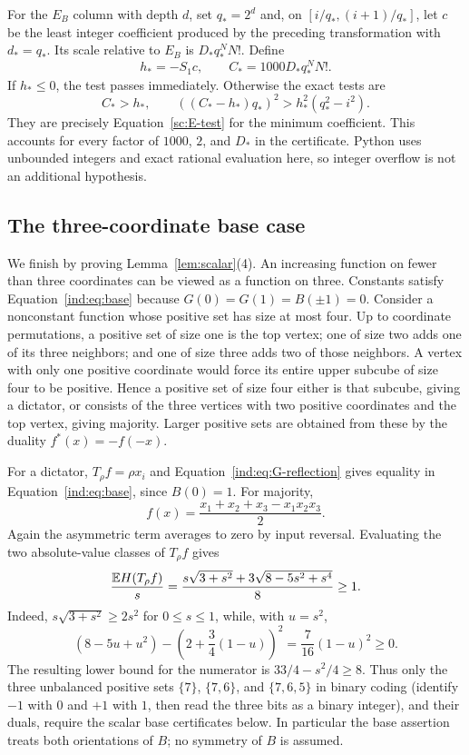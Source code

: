 For the $E_B$ column with depth $d$, set $q_*=2^d$ and, on
$[i/q_*,(i+1)/q_*]$, let $c$ be the least integer coefficient produced
by the preceding transformation with $d_*=q_*$.  Its scale relative to
$E_B$ is $D_*q_*^NN!$.  Define
\[
 h_*=-S_1c,\qquad C_*=1000D_*q_*^NN!.
\]
If $h_*\leq0$, the test passes immediately.  Otherwise the exact tests are
\begin{equation}\label{sc:E-integer}
 C_*>h_*,\qquad
 ((C_*-h_*)q_*)^2>h_*^2(q_*^2-i^2).
\end{equation}
They are precisely Equation~\eqref{sc:E-test} for the minimum coefficient.
This accounts for every factor of $1000$, $2$, and $D_*$ in the
certificate.  Python uses unbounded integers and exact rational
evaluation here, so integer overflow is not an additional hypothesis.

\subsection{The three-coordinate base case}\label{sc:base}

We finish by proving Lemma~\ref{lem:scalar}(4).  An increasing
function on fewer than three coordinates can be viewed as a function on
three.  Constants satisfy Equation~\eqref{ind:eq:base} because
$G(0)=G(1)=B(\pm1)=0$.  Consider a nonconstant function whose positive
set has size at most four.  Up to coordinate permutations, a positive
set of size one is the top vertex; one of size two adds one of its three
neighbors; and one of size three adds two of those neighbors.  A vertex
with only one positive coordinate would force its entire upper subcube
of size four to be positive.  Hence a positive set of size four either
is that subcube, giving a dictator, or consists of the three vertices
with two positive coordinates and the top vertex, giving majority.
Larger positive sets are obtained from these by the duality
$f^*(x)=-f(-x)$.

For a dictator, $T_\rho f=\rho x_i$ and
Equation~\eqref{ind:eq:G-reflection} gives equality in
Equation~\eqref{ind:eq:base}, since $B(0)=1$.  For majority,
\[
 f(x)=\frac{x_1+x_2+x_3-x_1x_2x_3}{2}.
\]
Again the asymmetric term averages to zero by input reversal.  Evaluating
the two absolute-value classes of $T_\rho f$ gives
\[
 \frac{\mathbb E H(T_\rho f)}s
 =\frac{s\sqrt{3+s^2}+3\sqrt{8-5s^2+s^4}}8\ge1.
\]
Indeed, $s\sqrt{3+s^2}\ge2s^2$ for $0\le s\le1$, while, with $u=s^2$,
\[
 (8-5u+u^2)-\left(2+\frac34(1-u)\right)^2
 =\frac7{16}(1-u)^2\ge0.
\]
The resulting lower bound for the numerator is
$33/4-s^2/4\ge8$.  Thus only the three unbalanced positive sets
$\{7\}$, $\{7,6\}$, and $\{7,6,5\}$ in binary coding (identify $-1$ with
$0$ and $+1$ with $1$, then read the three bits as a binary integer), and their duals,
require the scalar base certificates below.
In particular the base assertion treats both orientations of $B$;
no symmetry of $B$ is assumed.

